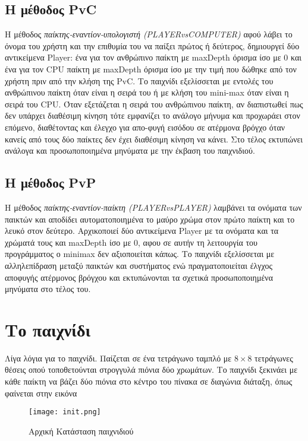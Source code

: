 \documentclass[12pt]{article}
\begin{document}
    \subsection{Η μέθοδος PvC}
    Η μέθοδος \textit{παίκτης-εναντίον-υπολογιστή (PLAYERvsCOMPUTER)} αφού λάβει το όνομα του χρήστη και την επιθυμία του να παίξει πρώτος ή δεύτερος, δημιουργεί δύο αντικείμενα Player: ένα για τον ανθρώπινο παίκτη με maxDepth όρισμα ίσο με 0 και ένα για τον CPU παίκτη με maxDepth όρισμα ίσο με την τιμή που δώθηκε από τον χρήστη πριν από την κλήση της PvC. Το παιχνίδι εξελίσσεται με εντολές του ανθρώπινου παίκτη όταν είναι η σειρά του ή με κλήση του mini-max όταν είναι η σειρά του CPU. Όταν εξετάζεται η σειρά του ανθρώπινου παίκτη, αν διαπιστωθεί πως δεν υπάρχει διαθέσιμη κίνηση τότε εμφανίζει το ανάλογο μήνυμα και προχωράει στον επόμενο, διαθέτοντας και έλεγχο για απο-φυγή εισόδου σε ατέρμονα βρόγχο όταν κανείς από τους δύο παίκτες δεν έχει διαθέσιμη κίνηση να κάνει. Στο τέλος εκτυπώνει ανάλογα και προσωποποιημένα μηνύματα με την έκβαση του παιχνιδιού.
    
    \subsection{Η μέθοδος PvP}
    Η μέθοδος \textit{παίκτης-εναντίον-παίκτη (PLAYERvsPLAYER)} λαμβάνει τα ονόματα των παικτών και αποδίδει αυτοματοποιημένα το μαύρο χρώμα στον πρώτο παίκτη και το λευκό στον δεύτερο. Αρχικοποιεί δύο αντικείμενα Player με τα ονόματα και τα χρώματά τους και maxDepth ίσο με 0, αφου σε αυτήν τη λειτουργία του προγράμματος ο minimax δεν αξιοποιείται κάπως. Το παιχνίδι εξελίσσεται με αλληλεπίδραση μεταξύ παικτών και συστήματος ενώ πραγματοποιείται έλγχος αποφυγής ατέρμονος βρόγχου και εκτυπώνονται τα σχετικά προσωποποιημένα μηνύματα στο τέλος του. 
\section{Το παιχνίδι}
Λίγα λόγια για το παιχνίδι. Παίζεται σε ένα τετράγωνο ταμπλό με $8\times8$ τετράγωνες θέσεις οπού τοποθετούνται στρογγυλά πιόνια δύο χρωμάτων. Το παιχνίδι ξεκινάει με κάθε παίκτη να βάζει δύο πιόνια στο κέντρο του πίνακα σε διαγώνια διάταξη, όπως φαίνεται στην εικόνα\\

            \begin{figure}[H]
                \centering
                \texttt{[image: init.png]}
                \caption{Αρχική Κατάσταση παιχνιδιού }
            \end{figure}
\end{document}
